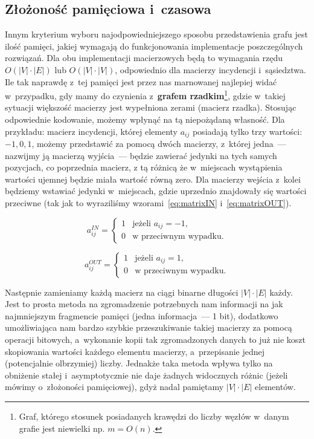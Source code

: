 \subsection{Złożoność pamięciowa i~czasowa}



Innym kryterium wyboru najodpowiedniejszego sposobu przedstawienia grafu jest ilość pamięci, jakiej wymagają do funkcjonowania implementacje poszczególnych rozwiązań.
Dla obu implementacji macierzowych będą to wymagania rzędu $O \left( \left| V \right| \cdot \left| E \right| \right)$ lub $O \left( \left| V \right| \cdot \left| V \right| \right)$, odpowiednio dla macierzy incydencji i~sąsiedztwa.
Ile tak naprawdę z~tej pamięci jest przez nas marnowanej najlepiej widać w~przypadku, gdy mamy do czynienia z~\textbf{grafem rzadkim}\footnote{
	Graf, którego stosunek posiadanych krawędzi do liczby węzłów w~danym grafie jest niewielki np. $m = O \left( n \right)$.
}, gdzie w~takiej sytuacji większość macierzy jest wypełniona zerami (macierz rzadka).
Stosując odpowiednie kodowanie, możemy wpłynąć na tą niepożądaną własność.
Dla przykładu: macierz incydencji, której elementy $a_{ij}$ posiadają tylko trzy wartości: $-1, 0, 1$, możemy przedstawić za pomocą dwóch macierzy, z~której jedna~--- nazwijmy ją macierzą wyjścia~--- będzie zawierać jedynki na tych samych pozycjach, co poprzednia macierz, z tą różnicą że w~miejscach wystąpienia wartości ujemnej będzie miała wartość równą zero.
Dla macierzy wejścia z~kolei będziemy wstawiać jedynki w~miejscach, gdzie uprzednio znajdowały się wartości przeciwne (tak jak to wyraziliśmy wzorami~\ref{eq:matrixIN} i~\ref{eq:matrixOUT}).

\begin{equation}
	a^{IN}_{ij}= \left\{ 
	\begin{array}{ll}
	1 & \textrm{jeżeli $a_{ij} = -1$,}\\
	0 & \textrm{w przeciwnym wypadku.}
	\end{array} \right.
	\label{eq:matrixIN}
\end{equation}

\begin{equation}
	a^{OUT}_{ij}= \left\{ 
	\begin{array}{ll}
	1 & \textrm{jeżeli $a_{ij} = 1$,}\\
	0 & \textrm{w przeciwnym wypadku.}
	\end{array} \right.
	\label{eq:matrixOUT}
\end{equation}

Następnie zamieniamy każdą macierz na ciągi binarne długości $\left| V \right| \cdot \left| E \right|$ każdy.
Jest to prosta metoda na zgromadzenie potrzebnych nam informacji na jak najmniejszym fragmencie pamięci (jedna informacja~--- 1 bit), dodatkowo umożliwiająca nam bardzo szybkie przeszukiwanie takiej macierzy za pomocą operacji bitowych, a~wykonanie kopii tak zgromadzonych danych to już nie koszt skopiowania wartości każdego elementu macierzy, a~przepisanie jednej (potencjalnie olbrzymiej) liczby.
Jednakże taka metoda wpływa tylko na obniżenie stałej i~asymptotycznie nie daje żadnych widocznych różnic (jeżeli mówimy o~złożoności pamięciowej), gdyż nadal pamiętamy $\left| V \right| \cdot \left| E \right|$ elementów.

